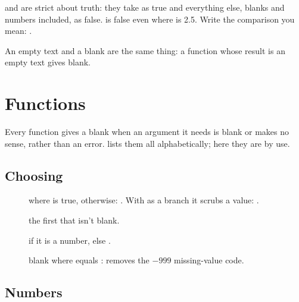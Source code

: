  and  are strict about truth: they take  as true and everything else,
blanks and numbers included, as false.  is false even where  is 2.5.
Write the comparison you mean: .

An empty text and a blank are the same thing: a function whose result is an empty text gives blank.

\section{Functions}\label{sec:functions}

Every function gives a blank when an argument it needs is blank or makes no sense, rather than an error.
 lists them all alphabetically; here they are by use.

\subsection{Choosing}

\begin{description}
\item[]  where  is true,  otherwise:
. With  as a branch it scrubs a value:
.
\item[] the first that isn't blank.
\item[]  if it is a number, else .
\item[] blank where  equals :  removes the
$-999$ missing-value code.
\end{description}

\subsection{Numbers}

